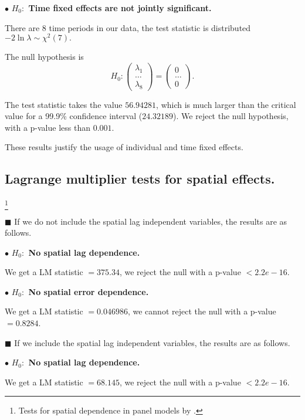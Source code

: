 \documentclass[11pt,a4paper]{amsart}
\theoremstyle{plain}
\theoremstyle{definition}
\begin{document}
$\bullet$ \textbf{$H_{0}:$ Time fixed effects are not jointly significant.} 
		
There are $8$ time periods in our data, the test statistic is distributed  $-2 \ln \lambda \sim \chi^{2}(7).$
		
The null hypothesis is 
\[	H_{0}: \begin{pmatrix}
		\lambda_{1} \\
		\dots \\
		\lambda_{8}
\end{pmatrix} = \begin{pmatrix}
		0 \\
		\dots \\
		0
\end{pmatrix}.	\]
		
The test statistic takes the value $56.94281$, which is much larger than the critical value for a 99.9\% confidence interval ($24.32189$). We reject the null hypothesis, with a p-value less than $0.001$.
		
These results justify the usage of individual and time fixed effects. 
		
\subsection{Lagrange multiplier tests for spatial effects.}\footnote{Tests for spatial dependence in panel models by \parencite{anselinSpatialPanelEconometrics2008}.}\hfill\par

$\blacksquare$ If we do not include the spatial lag independent variables, the results are as follows. 

$\bullet$ \textbf{$H_{0}:$ No spatial lag dependence.} 

We get a LM statistic $= 375.34$, we reject the null with a  p-value $< 2.2e-16$. 

$\bullet$ \textbf{$H_{0}:$ No spatial error dependence.} 

We get a LM statistic $= 0.046986$, we cannot reject the null with a  p-value $= 0.8284$. 

\vspace{5pt}

$\blacksquare$ If we include the spatial lag independent variables, the results are as follows.

$\bullet$ \textbf{$H_{0}:$ No spatial lag dependence.} 

We get a LM statistic $= 68.145$, we reject the null with a  p-value $< 2.2e-16$. 
\end{document}
